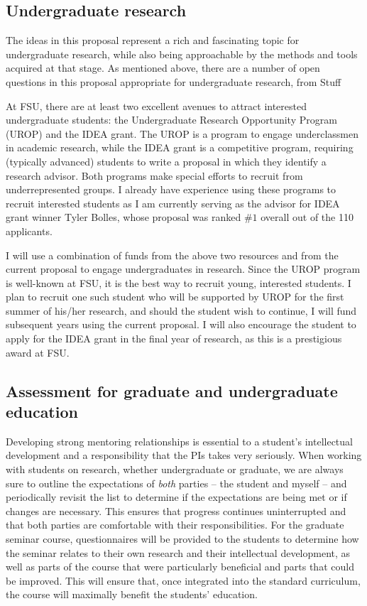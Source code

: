 \documentclass[11pt]{article}
\begin{document}
\subsection{Undergraduate research}
The ideas in this proposal represent a rich and fascinating topic for undergraduate research, while also being approachable by the methods and tools acquired at that stage. As mentioned above, there are a number of open questions in this proposal appropriate for undergraduate research, from {\color{blue} Stuff}
	
At FSU, there are at least two excellent avenues to attract interested undergraduate students:  the Undergraduate Research Opportunity Program (UROP) and the IDEA grant. The UROP is a program to engage underclassmen in academic research, while the IDEA grant is a competitive program, requiring (typically advanced) students to write a proposal in which they identify a research advisor. Both programs make special efforts to recruit from underrepresented groups. I already have experience using these programs to recruit interested students as I am currently serving as the advisor for IDEA grant winner Tyler Bolles, whose proposal was ranked $\#1$ overall out of the 110 applicants.

I will use a combination of funds from the above two resources and from the current proposal to engage undergraduates in research. Since the UROP program is well-known at FSU, it is the best way to recruit young, interested students. I plan to recruit one such student who will be supported by UROP for the first summer of his/her research, and should the student wish to continue, I will fund subsequent years using the current proposal. I will also encourage the student to apply for the IDEA grant in the final year of research, as this is a prestigious award at FSU. 


\subsection{Assessment for graduate and undergraduate education}

Developing strong mentoring relationships is essential to a student's intellectual development and a responsibility that the PIs takes very seriously. When working with students on research, whether undergraduate or graduate, we are always sure to outline the expectations of {\em both} parties -- the student and myself -- and periodically revisit the list to determine if the expectations are being met or if changes are necessary. This ensures that progress continues uninterrupted and that both parties are comfortable with their responsibilities. For the graduate seminar course, questionnaires will be provided to the students to determine how the seminar relates to their own research and their intellectual development, as well as parts of the course that were particularly beneficial and parts that could be improved. This will ensure that, once integrated into the standard curriculum, the course will maximally benefit the students' education.
\end{document}
